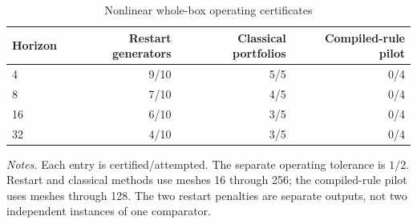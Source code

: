 \begin{table}[t]\centering\small\caption{Nonlinear whole-box operating certificates}\label{tab:multistate_summary}
\begin{tabular}{lrrr}
\toprule
Horizon & Restart generators & Classical portfolios & Compiled-rule pilot \\
\midrule
4 & 9/10 & 5/5 & 0/4 \\
8 & 7/10 & 4/5 & 0/4 \\
16 & 6/10 & 3/5 & 0/4 \\
32 & 4/10 & 3/5 & 0/4 \\
\bottomrule\end{tabular}
\par\smallskip\begin{minipage}{\linewidth}\footnotesize\emph{Notes.} Each entry is certified/attempted. The separate operating tolerance is $1/2$. Restart and classical methods use meshes 16 through 256; the compiled-rule pilot uses meshes through 128. The two restart penalties are separate outputs, not two independent instances of one comparator.\end{minipage}
\end{table}
